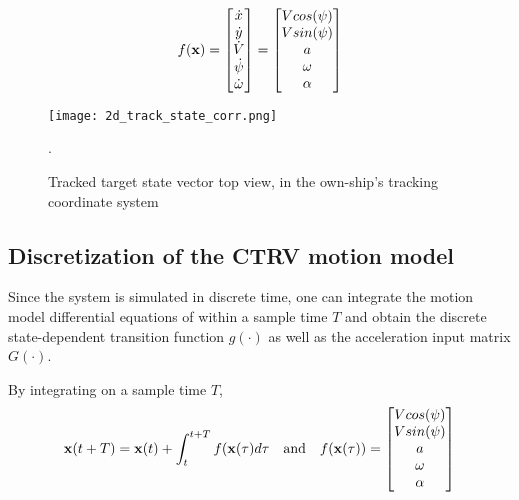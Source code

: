 \begin{equation}\label{eq:CTRV_driven}
f(\mathbf{x}) =\begin{bmatrix}\dot{x} \\ \dot{y} \\ \dot{{V}} \\ \dot{{\psi}} \\ \dot{\omega}  \end{bmatrix}=  \begin{bmatrix}{V} cos({\psi}) \\ {V} sin({\psi}) \\ {a} \\ \omega \\ {\alpha}  \end{bmatrix}
\end{equation}
\begin{figure}[H]
	\centering
	\texttt{[image: 2d\_track\_state\_corr.png]}
	\caption{Tracked target state vector top view, in the own-ship's tracking coordinate system}.
	\label{fig:state_vector}
\end{figure}

\subsection{Discretization of the CTRV motion model}

Since the system is simulated in discrete time, one can integrate the motion model differential equations of  within a sample time $T$ and obtain the discrete state-dependent transition function $g(\cdot)$ as well as the acceleration input matrix $G(\cdot)$.

By integrating on a sample time $T$,
\begin{equation}\label{eq:motionintegral}
\begin{aligned}
\mathbf{x}(t+T) = \mathbf{x}(t) + \int_{t}^{t+T}f(\mathbf{x}(\tau)d\tau &&\text{and}&& f(\mathbf{x(\tau)})=  \begin{bmatrix}{V} cos({\psi}) \\ {V} sin({\psi}) \\ {a} \\ \omega \\ {\alpha}  \end{bmatrix}
\end{aligned}
\end{equation}

